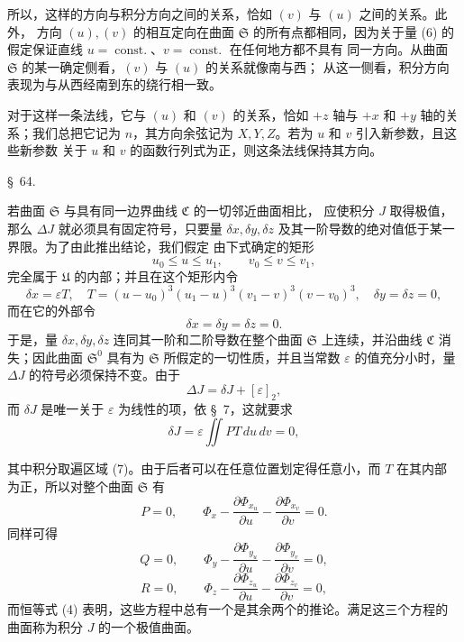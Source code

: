 \documentclass[11pt,a4paper,leqno]{article}
\begin{document}
所以，这样的方向与积分方向之间的关系，恰如 $(v)$ 与 $(u)$ 之间的关系。此外，
方向 $(u),(v)$ 的相互定向在曲面 $\mathfrak{S}$ 的所有点都相同，因为关于量 (6)
的假定保证直线 $u=\operatorname{const.}$、$v=\operatorname{const.}$ 在任何地方都不具有
同一方向。从曲面 $\mathfrak{S}$ 的某一确定侧看，$(v)$ 与 $(u)$ 的关系就像南与西；
从这一侧看，积分方向表现为与从西经南到东的绕行相一致。

对于这样一条法线，它与 $(u)$ 和 $(v)$ 的关系，恰如 $+z$ 轴与 $+x$ 和
$+y$ 轴的关系；我们总把它记为 $n$，其方向余弦记为 $X,Y,Z$。若为 $u$ 和 $v$ 引入新参数，且这些新参数
关于 $u$ 和 $v$ 的函数行列式为正，则这条法线保持其方向。

\begin{center}
{\large \S~64.}
\end{center}

若曲面 $\mathfrak{S}$ 与具有同一边界曲线 $\mathfrak{C}$ 的一切邻近曲面相比，
应使积分 $J$ 取得极值，那么 $\Delta J$ 就必须具有固定符号，只要量
$\delta x,\delta y,\delta z$ 及其一阶导数的绝对值低于某一界限。为了由此推出结论，我们假定
由下式确定的矩形
\begin{equation}\tag{7}
u_0\leq u\leq u_1,\qquad v_0\leq v\leq v_1,
\end{equation}
完全属于 $\mathfrak{U}$ 的内部；并且在这个矩形内令
\[
\delta x=\varepsilon T,\quad
T=(u-u_0)^3(u_1-u)^3(v_1-v)^3(v-v_0)^3,
\quad \delta y=\delta z=0,
\]
而在它的外部令
\[
\delta x=\delta y=\delta z=0.
\]
于是，量 $\delta x,\delta y,\delta z$ 连同其一阶和二阶导数在整个曲面
$\mathfrak{S}$ 上连续，并沿曲线 $\mathfrak{C}$ 消失；因此曲面
$\mathfrak{S}^0$ 具有为 $\mathfrak{S}$ 所假定的一切性质，并且当常数
$\varepsilon$ 的值充分小时，量 $\Delta J$ 的符号必须保持不变。由于
\[
\Delta J=\delta J+[\varepsilon]_2,
\]
而 $\delta J$ 是唯一关于 $\varepsilon$ 为线性的项，依 \S~7，这就要求
\[
\delta J=\varepsilon\iint PT\,du\,dv=0,
\]

其中积分取遍区域 (7)。由于后者可以在任意位置划定得任意小，而 $T$ 在其内部
为正，所以对整个曲面 $\mathfrak{S}$ 有
\[
P=0,\qquad
\Phi_x-\frac{\partial\Phi_{x_u}}{\partial u}
-\frac{\partial\Phi_{x_v}}{\partial v}=0.
\]
同样可得
\[
Q=0,\qquad
\Phi_y-\frac{\partial\Phi_{y_u}}{\partial u}
-\frac{\partial\Phi_{y_v}}{\partial v}=0,
\]
\[
R=0,\qquad
\Phi_z-\frac{\partial\Phi_{z_u}}{\partial u}
-\frac{\partial\Phi_{z_v}}{\partial v}=0,
\]
而恒等式 (4) 表明，这些方程中总有一个是其余两个的推论。满足这三个方程的
曲面称为积分 $J$ 的一个极值曲面。
\end{document}
